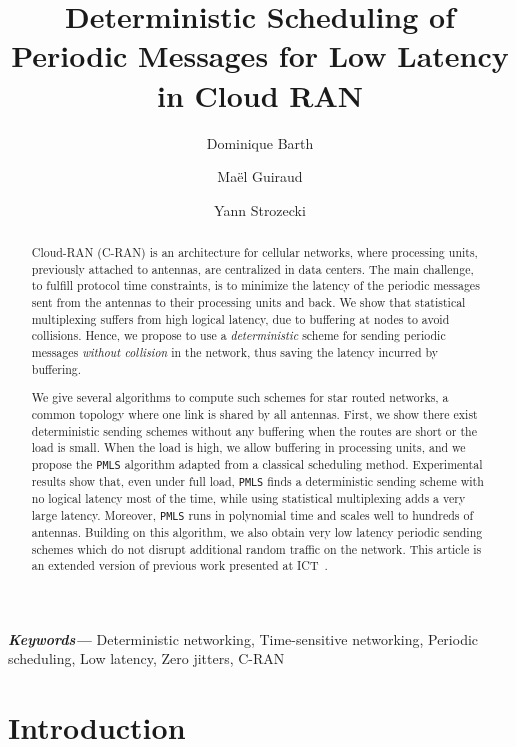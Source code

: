 \documentclass[a4paper,10pt]{journal}
\title{Deterministic Scheduling of Periodic Messages for Low Latency in Cloud RAN}
\author[1]{Dominique Barth}
\author[2]{Ma\"el Guiraud}
\author[1]{Yann Strozecki}
\affil[1]{DAVID Laboratory, UVSQ, Versailles, FRANCE}
\affil[2]{LINEACT Laboratory, CESI, Nanterre, FRANCE}
\newcommand\PMLS{\texttt{PMLS}\xspace}
\providecommand{\keywords}[1]
{
  \small	
  \textbf{\textit{Keywords---}} #1
}
\begin{document}
\maketitle

\begin{abstract}
Cloud-RAN (C-RAN) is an architecture for cellular networks, where processing units, previously attached to antennas, are centralized in data centers. The main challenge, to fulfill protocol time constraints, is to minimize the latency of the periodic messages sent from the antennas to their processing units and back. We show that statistical multiplexing suffers from high logical latency, due to buffering at nodes to avoid collisions. Hence, we propose to use a \emph{deterministic} scheme for sending periodic messages \emph{without collision} in the network, thus saving the latency incurred by buffering.

We give several algorithms to compute such schemes for star routed networks, a common topology where one link is shared by all antennas. First, we show there exist deterministic sending schemes without any buffering when the routes are short or the load is small. When the load is high, we allow buffering in processing units, and we propose the \PMLS algorithm adapted from a classical scheduling method. Experimental results show that, even under full load, \PMLS finds a deterministic sending scheme with no logical latency most of the time, while using statistical multiplexing adds a very large latency. Moreover, \PMLS runs in polynomial time and scales well to hundreds of antennas. Building on this algorithm, we also obtain very low latency periodic sending schemes which do not disrupt additional random traffic on the network. This article is an extended version of previous work presented at ICT~\cite{Guir1806:Deterministic}.
\end{abstract}
\keywords{Deterministic networking, Time-sensitive networking, Periodic scheduling, Low latency, Zero jitters, C-RAN}

\section{Introduction}
\end{document}
